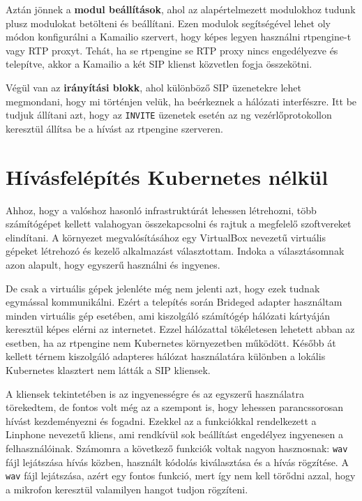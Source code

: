 Aztán jönnek a \textbf{modul beállítások}, ahol az alapértelmezett modulokhoz tudunk plusz
modulokat betölteni és beállítani. Ezen modulok segítségével lehet oly módon konfigurálni 
a Kamailio szervert, hogy képes legyen használni rtpengine-t vagy RTP proxyt. Tehát, ha 
se rtpengine se RTP proxy nincs engedélyezve és telepítve, akkor a Kamailio a két SIP 
klienst közvetlen fogja összekötni.

Végül van az \textbf{irányítási blokk}, ahol különböző SIP üzenetekre lehet megmondani, 
hogy mi történjen velük, ha beérkeznek a hálózati interfészre. Itt be tudjuk állítani 
azt, hogy az \texttt{INVITE} üzenetek esetén az ng vezérlőprotokollon keresztül állítsa 
be a hívást az rtpengine szerveren.

\section{Hívásfelépítés Kubernetes nélkül}

Ahhoz, hogy a valóshoz hasonló infrastruktúrát lehessen létrehozni, több 
számítógépet kellett valahogyan összekapcsolni és rajtuk a megfelelő szoftvereket
elindítani. A környezet megvalósításához egy VirtualBox nevezetű virtuális gépeket
létrehozó és kezelő alkalmazást választottam. Indoka a választásomnak azon
alapult, hogy egyszerű használni és ingyenes.

De csak a virtuális gépek jelenléte még nem jelenti azt, hogy ezek tudnak egymással 
kommunikálni. Ezért a telepítés során Brideged adapter használtam minden virtuális gép 
esetében, ami kiszolgáló számítógép hálózati kártyáján keresztül képes elérni az 
internetet. Ezzel hálózattal tökéletesen lehetett abban az esetben, ha az rtpengine nem 
Kubernetes környezetben működött. Később át kellett térnem kiszolgáló adapteres hálózat 
használatára különben a lokális Kubernetes klasztert nem látták a SIP kliensek. 

A kliensek tekintetében is az ingyenességre és az egyszerű használatra törekedtem, 
de fontos volt még az a szempont is, hogy lehessen parancssorosan hívást kezdeményezni
és fogadni. Ezekkel az a funkciókkal rendelkezett a Linphone nevezetű kliens, ami
rendkívül sok beállítást engedélyez ingyenesen a felhasználóinak. Számomra a következő
funkciók voltak nagyon hasznosnak: \texttt{wav} fájl lejátszása hívás közben, használt 
kódolás kiválasztása és a hívás rögzítése. A \texttt{wav} fájl lejátszása, azért egy 
fontos funkció, mert így nem kell törődni azzal, hogy a mikrofon keresztül valamilyen 
hangot tudjon rögzíteni.

